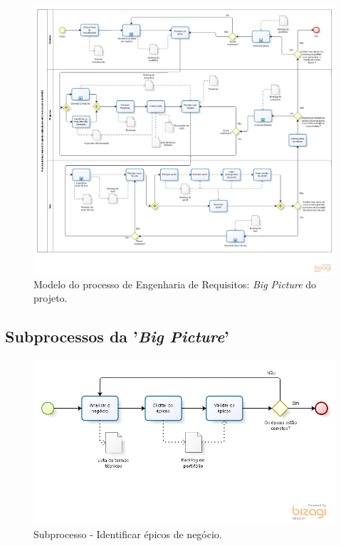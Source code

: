   
  \begin{figure}[!htbp]
  \centering
  \includegraphics[scale=0.44, angle = 90]{editaveis/figuras/project_big_picture}
  \caption[Modelo do processo de Engenharia de Requisitos: \textit{Big Picture} do projeto]
      {Modelo do processo de Engenharia de Requisitos: \textit{Big Picture} do projeto.}
  \label{project_big_picture}
  \end{figure}

  \subsection{Subprocessos da '\textit{Big Picture}'}

    \begin{figure}[!htbp]
      \centering
      \includegraphics[scale=0.55]{editaveis/figuras/processo_identificar_epicos}
      \caption[Subprocesso - Identificar épicos de negócio]{Subprocesso - Identificar épicos de negócio.}
      \label{processo_identificar_epicos}
    \end{figure}

